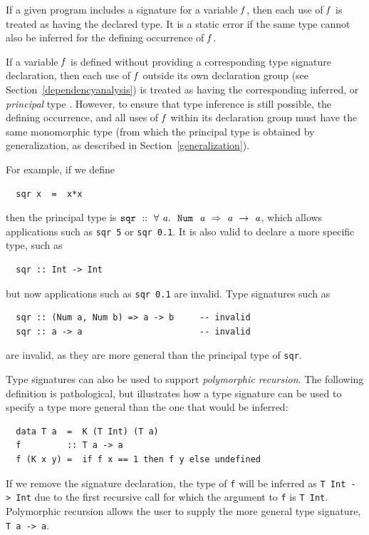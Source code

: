 If a given program includes a signature
for a variable \mbox{$\it f$}, then each use of \mbox{$\it f$} is treated as having the
declared type.  It is a static error if the same type cannot also be
inferred for the defining occurrence of \mbox{$\it f$}.

If a variable \mbox{$\it f$} is defined without providing a corresponding type
signature declaration, then each use of \mbox{$\it f$} outside its own declaration
group (see Section~\ref{dependencyanalysis}) is treated as having the
corresponding inferred, or {\em principal} type .
However, to ensure that type inference is still possible, the defining
occurrence, and all uses of \mbox{$\it f$} within its declaration group must have
the same monomorphic type (from which the principal type is obtained
by generalization, as described in Section~\ref{generalization}).

%
For example, if we define\nopagebreak[4]
\bprog
{\small\begin{verbatim}
  sqr x  =  x*x
\end{verbatim}}
\eprog
then the principal type is 
\mbox{$\it \makebox{\tt sqr}\ ::\ \forall\ a.~\ \makebox{\tt Num}~\ a\ \Rightarrow\ a\ \rightarrow\ a$}, 
which allows
applications such as \mbox{\tt sqr\ 5} or \mbox{\tt sqr\ 0.1}.  It is also valid to declare
a more specific type, such as
\bprog
{\small\begin{verbatim}
  sqr :: Int -> Int
\end{verbatim}}
\eprog
but now applications such as \mbox{\tt sqr\ 0.1} are invalid.  Type signatures such as
\bprog
{\small\begin{verbatim}
  sqr :: (Num a, Num b) => a -> b     -- invalid
  sqr :: a -> a                       -- invalid
\end{verbatim}}
\eprog
are invalid, as they are more general than the principal type of \mbox{\tt sqr}.

Type signatures can also be used to support
{\em polymorphic recursion}.
The following definition is pathological, but illustrates how a type
signature can be used to specify a type more general than the one that
would be inferred:
\bprog
{\small\begin{verbatim}
  data T a  =  K (T Int) (T a)
  f         :: T a -> a
  f (K x y) =  if f x == 1 then f y else undefined
\end{verbatim}}
\eprog
If we remove the signature declaration, the type of \mbox{\tt f} will be
inferred as \mbox{\tt T\ Int\ ->\ Int} due to the first recursive call for which
the argument to \mbox{\tt f} is \mbox{\tt T\ Int}.  Polymorphic recursion allows the user
to supply the more general type signature, \mbox{\tt T\ a\ ->\ a}.

